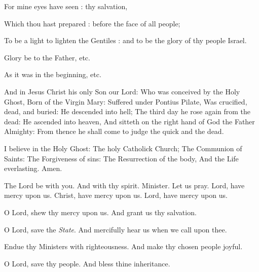 For mine eyes have seen : thy salvation,

Which thou hast prepared : before the face of all people;

To be a light to lighten the Gentiles : and to be the glory of thy people Israel.

Glory be to the Father, etc.

As it was in the beginning, etc.




And in Jesus Christ his only Son our Lord: Who was conceived by the Holy Ghost, Born of the Virgin Mary: Suffered under Pontius Pilate, Was crucified, dead, and buried: He descended into hell; The third day he rose again from the dead: He ascended into heaven, And sitteth on the right hand of God the Father Almighty: From thence he shall come to judge the quick and the dead.

I believe in the Holy Ghost: The holy Catholick Church; The Communion of Saints: The Forgiveness of sins: The Resurrection of the body, And the Life everlasting. Amen.


\V The Lord be with you.  \R And with thy spirit.
Minister. Let us pray.
Lord, have mercy upon us.
    Christ, have mercy upon us.
Lord, have mercy upon us.



\V O Lord, shew thy mercy upon us.  \R And grant us thy salvation.

\V O Lord, save the \emph{State}.  \R And mercifully hear us when we call upon thee.

\V Endue thy Ministers with righteousness.  \R And make thy chosen people joyful.

\V  O Lord, save thy people.  \R And bless thine inheritance.

